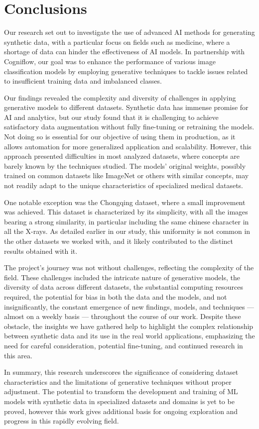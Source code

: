 \chapter{Conclusions}

Our research set out to investigate the use of advanced AI methods for generating synthetic data, with a particular focus on fields such as medicine, where a shortage of data can hinder the effectiveness of AI models. In partnership with Cogniflow, our goal was to enhance the performance of various image classification models by employing generative techniques to tackle issues related to insufficient training data and imbalanced classes.

Our findings revealed the complexity and diversity of challenges in applying generative models to different datasets. Synthetic data has immense promise for AI and analytics, but our study found that it is challenging to achieve satisfactory data augmentation without fully fine-tuning or retraining the models. Not doing so is essential for our objective of using them in production, as it allows automation for more generalized application and scalability. However, this approach presented difficulties in most analyzed datasets, where concepts are barely known by the techniques studied. The models' original weights, possibly trained on common datasets like ImageNet or others with similar concepts, may not readily adapt to the unique characteristics of specialized medical datasets.

One notable exception was the Chongqing dataset, where a small improvement was achieved. This dataset is characterized by its simplicity, with all the images bearing a strong similarity, in particular including the same chinese character in all the X-rays. As detailed earlier in our study, this uniformity is not common in the other datasets we worked with, and it likely contributed to the distinct results obtained with it.

The project's journey was not without challenges, reflecting the complexity of the field. These challenges included the intricate nature of generative models, the diversity of data across different datasets, the substantial computing resources required, the potential for bias in both the data and the models, and not insignificantly, the constant emergence of new findings, models, and techniques — almost on a weekly basis — throughout the course of our work. Despite these obstacle, the insights we have gathered help to highlight the complex relationship between synthetic data and its use in the real world applications, emphasizing the need for careful consideration, potential fine-tuning, and continued research in this area. 

In summary, this research underscores the significance of considering dataset characteristics and the limitations of generative techniques without proper adjustment. The potential to transform the development and training of ML models with synthetic data in specialized datasets and domains is yet to be proved, however this work gives additional basis for ongoing exploration and progress in this rapidly evolving field.
